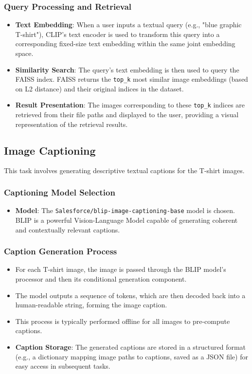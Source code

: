 \documentclass{article}
\begin{document}
\subsubsection{Query Processing and Retrieval}
\begin{itemize}
    \item \textbf{Text Embedding}: When a user inputs a textual query (e.g., "blue graphic T-shirt"), CLIP's text encoder is used to transform this query into a corresponding fixed-size text embedding within the same joint embedding space.
    \item \textbf{Similarity Search}: The query's text embedding is then used to query the FAISS index. FAISS returns the \texttt{top\_k} most similar image embeddings (based on L2 distance) and their original indices in the dataset.
    \item \textbf{Result Presentation}: The images corresponding to these \texttt{top\_k} indices are retrieved from their file paths and displayed to the user, providing a visual representation of the retrieval results.
\end{itemize}

\subsection{Image Captioning}
This task involves generating descriptive textual captions for the T-shirt images.

\subsubsection{Captioning Model Selection}
\begin{itemize}
    \item \textbf{Model}: The \texttt{Salesforce/blip-image-captioning-base} model is chosen. BLIP is a powerful Vision-Language Model capable of generating coherent and contextually relevant captions.
\end{itemize}

\subsubsection{Caption Generation Process}
\begin{itemize}
    \item For each T-shirt image, the image is passed through the BLIP model's processor and then its conditional generation component.
    \item The model outputs a sequence of tokens, which are then decoded back into a human-readable string, forming the image caption.
    \item This process is typically performed offline for all images to pre-compute captions.
    \item \textbf{Caption Storage}: The generated captions are stored in a structured format (e.g., a dictionary mapping image paths to captions, saved as a JSON file) for easy access in subsequent tasks.
\end{itemize}
\end{document}
